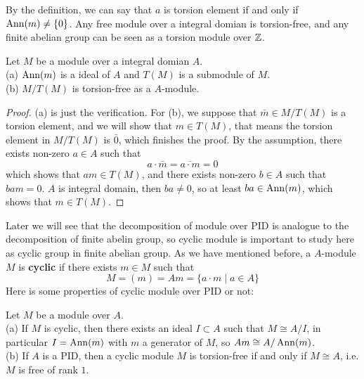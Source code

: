 \documentclass[12pt,a4paper]{article}
\begin{document}
By the definition, we can say that \(a\) is torsion element if and only if \(\operatorname{Ann}(m) \neq \{0\}\). Any free module over a integral domian is torsion-free, and any finite abelian group can be seen as a torsion module over \(\mathbb{Z}\).

\begin{propositionplain}
    Let \(M\) be a module over a integral domian \(A\).\\

    (a) \(\operatorname{Ann}(m)\) is a ideal of \(A\) and \(T(M)\) is a submodule of \(M\).\\

    (b) \(M/T(M)\) is torsion-free as a \(A\)-module.

    \begin{proof}
        (a) is just the verification. For (b), we suppose that \(\bar{m} \in M/T(M)\) is a torsion element, and we will show that \(m \in T(M)\), that means the torsion element in \(M/T(M)\) is \(\bar{0}\), which finishes the proof. By the assumption, there exists non-zero \(a \in A\) such that
        \[a \cdot \bar{m} = \overline{a \cdot m} = 0\]
        which shows that \(am \in T(M)\), and there exists non-zero \(b \in A\) such that \(bam = 0\). \(A\) is integral domain, then \(ba \neq 0\), so at least \(ba \in \operatorname{Ann}(m)\), which shows that \(m \in T(M)\).
    \end{proof}
\end{propositionplain}

Later we will see that the decomposition of module over PID is analogue to the decomposition of finite abelin group, so cyclic module is important to study here as cyclic group in finite abelian group. As we have mentioned before, a \(A\)-module \(M\) is \textbf{cyclic} if there exists \(m \in M\) such that
\[M = (m) = Am = \{a \cdot m \mid a \in A\}\]
Here is some properties of cyclic module over PID or not:

\begin{propositionplain} \label{cyclicmodule}
    Let \(M\) be a module over \(A\).\\

    (a) If \(M\) is cyclic, then there exists an ideal \(I \subset A\) such that \(M \cong A/I\), in particular \(I = \operatorname{Ann}(m)\) with \(m\) a generator of \(M\), so \(Am \cong A/\operatorname{Ann}(m)\).\\

    (b) If \(A\) is a PID, then a cyclic module \(M\) is torsion-free if and only if \(M \cong A\), i.e. \(M\) is free of rank \(1\).
\end{propositionplain}
\end{document}
